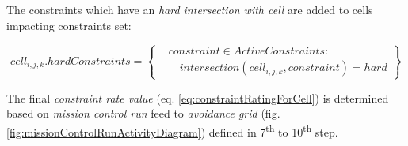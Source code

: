 \noindent The constraints which have an \emph{hard intersection with cell} are added to cells impacting constraints set:

\begin{equation}\label{eq:hardConstraintsCellIntersections}
    cell_{i,j,k}. hard Constraints = 
    \left\{
        \begin{aligned}
            &constraint \in Active Constraints:\\ 
            &\quad intersection(cell_{i,j,k},constraint) = hard
        \end{aligned}
    \right\}
\end{equation}

\begin{note}
    The final \emph{constraint rate value} (eq. \ref{eq:constraintRatingForCell}) is determined based on \emph{mission control run} feed to \emph{avoidance grid} (fig. \ref{fig:missionControlRunActivityDiagram}) defined in 7\textsuperscript{th} to 10\textsuperscript{th} step.
\end{note}
    
